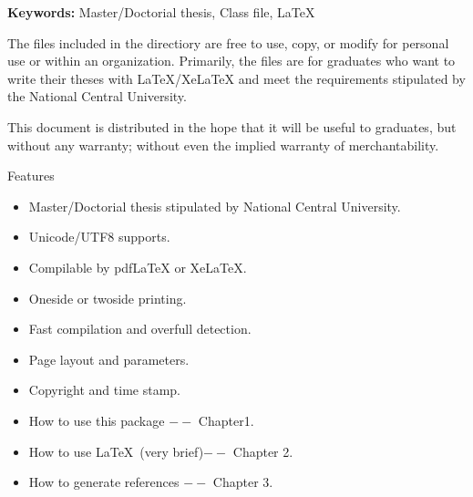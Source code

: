 \begin{abstracten}

{\bf \sf Keywords:} Master/Doctorial thesis, Class file, \LaTeX

\vspace{2em}

The files included in the directiory are free to use, copy, or modify for personal use or within an organization. Primarily, the files are for graduates who want to write their theses with \LaTeX/Xe\LaTeX{} and meet the requirements stipulated by the National Central University.

This document is distributed in the hope that it will be useful to graduates, but without any warranty; without even the implied warranty of merchantability.
\begin{center}
Features
\begin{itemize}
\item Master/Doctorial thesis stipulated by National Central University. 
\item Unicode/UTF8 supports.
\item Compilable by pdf\LaTeX{ } or Xe\LaTeX. 
\item Oneside or twoside printing.
\item Fast compilation and overfull detection. 
\item Page layout and parameters.
\item Copyright and time stamp.
\item How to use this package $--$ Chapter1.
\item How to use \LaTeX\ (very brief)$--$ Chapter 2.
\item How to generate references $--$ Chapter 3.
\end{itemize}
\end{center}
\end{abstracten} 

